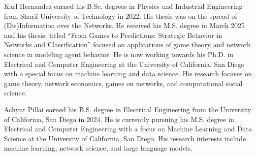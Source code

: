 \documentclass[journal]{IEEEtran}
\begin{document}
\captionsetup{font=footnotesize} %


         





\clearpage



\newpage

\begin{IEEEbiography}{Karl Hernandez} earned his B.Sc. degrees in Physics and Industrial Engineering from Sharif University of Technology in 2022. His thesis was on the spread of (Dis)Information over the Networks. He received his M.S. degree in March 2025 and his thesis, titled ``From Games to Predictions: Strategic Behavior in Networks and Classification'' focused on applications of game theory and network science in modeling agent behavior. He is now working towards his Ph.D. in Electrical and Computer Engineering at the University of California, San Diego with a special focus on machine learning and data science. His research focuses on game theory, network economics, games on networks, and computational social science. 
\end{IEEEbiography}
\vspace{-1in}
\begin{IEEEbiography} {Achyut Pillai} earned his B.S. degree in Electrical Engineering from the University of California, San Diego in 2024. He is currently pursuing his M.S. degree in Electrical and Computer Engineering with a focus on Machine Learning and Data Science at the University of California, San Diego. His research interests include machine learning, network science, and large language models.
\end{IEEEbiography}
\end{document}
